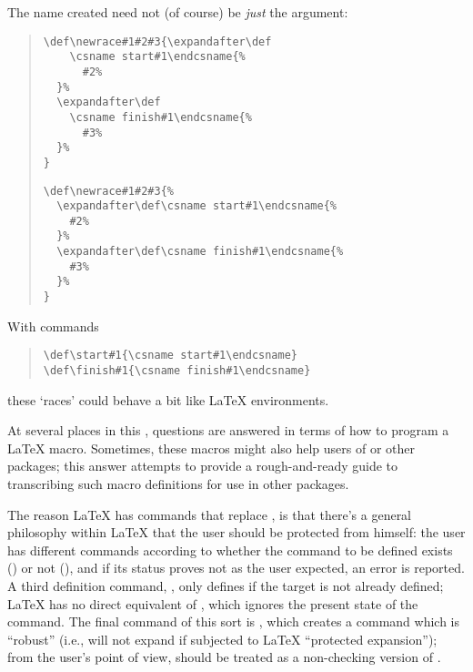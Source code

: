 The name created need not (of course) be \emph{just} the argument:
\begin{quote}
\begin{narrowversion}
\begin{verbatim}
\def\newrace#1#2#3{\expandafter\def
    \csname start#1\endcsname{%
      #2%
  }%
  \expandafter\def
    \csname finish#1\endcsname{%
      #3%
  }%
}
\end{verbatim}
\end{narrowversion}
\begin{wideversion}
\begin{verbatim}
\def\newrace#1#2#3{%
  \expandafter\def\csname start#1\endcsname{%
    #2%
  }%
  \expandafter\def\csname finish#1\endcsname{%
    #3%
  }%
}
\end{verbatim}
\end{wideversion}
\end{quote}
With commands
\begin{quote}
\begin{verbatim}
\def\start#1{\csname start#1\endcsname}
\def\finish#1{\csname finish#1\endcsname}
\end{verbatim}
\end{quote}
these `races' could behave a bit like \LaTeX{} environments.


At several places in this , questions are answered in terms
of how to program a \LaTeX{} macro.  Sometimes, these macros might
also help users of \plaintex{} or other packages; this answer
attempts to provide a rough-and-ready guide to transcribing such macro
definitions for use in other packages.

The reason \LaTeX{} has commands that replace , is that
there's a general philosophy within \LaTeX{} that the user should be
protected from himself: the user has different commands according to
whether the command to be defined exists () or not
(), and if its status proves not as the user expected,
an error is reported.  A third definition command,
, only defines if the target is not already
defined; \LaTeX{} has no direct equivalent of , which ignores
the present state of the command.  The final command of this sort is
, which creates a command which is ``robust''
(i.e., will not expand if subjected to \LaTeX{} ``protected
expansion''); from the \plaintex{} user's point of view,
 should be treated as a non-checking version
of .

